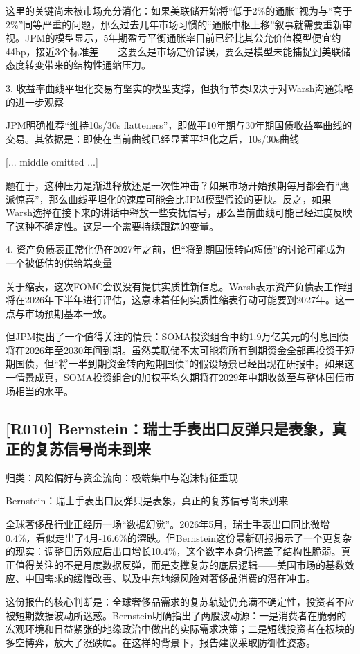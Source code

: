 \documentclass[11pt]{ctexart}
\begin{document}
这里的关键尚未被市场充分消化：如果美联储开始将“低于2\%的通胀”视为与“高于2\%”同等严重的问题，那么过去几年市场习惯的“通胀中枢上移”叙事就需要重新审视。JPM的模型显示，5年期盈亏平衡通胀率目前已经比其公允价值模型便宜约44bp，接近3个标准差——这要么是市场定价错误，要么是模型未能捕捉到美联储态度转变带来的结构性通缩压力。

3. 收益率曲线平坦化交易有坚实的模型支撑，但执行节奏取决于对Warsh沟通策略的进一步观察

JPM明确推荐“维持10s/30s flatteners”，即做平10年期与30年期国债收益率曲线的交易。其依据是：即使在当前曲线已经显著平坦化之后，10s/30s曲线

[... middle omitted ...]

题在于，这种压力是渐进释放还是一次性冲击？如果市场开始预期每月都会有“鹰派惊喜”，那么曲线平坦化的速度可能会比JPM模型假设的更快。反之，如果Warsh选择在接下来的讲话中释放一些安抚信号，那么当前曲线可能已经过度反映了这种不确定性。这是一个需要持续跟踪的变量。

4. 资产负债表正常化仍在2027年之前，但“将到期国债转向短债”的讨论可能成为一个被低估的供给端变量

关于缩表，这次FOMC会议没有提供实质性新信息。Warsh表示资产负债表工作组将在2026年下半年进行评估，这意味着任何实质性缩表行动可能要到2027年。这一点与市场预期基本一致。

但JPM提出了一个值得关注的情景：SOMA投资组合中约1.9万亿美元的付息国债将在2026年至2030年间到期。虽然美联储不太可能将所有到期资金全部再投资于短期国债，但“将一半到期资金转向短期国债”的假设场景已经出现在研报中。如果这一情景成真，SOMA投资组合的加权平均久期将在2029年中期收敛至与整体国债市场相当的水平。

\subsection{[R010] Bernstein：瑞士手表出口反弹只是表象，真正的复苏信号尚未到来}
{\small\color{refgray}归类：风险偏好与资金流向：极端集中与泡沫特征重现}

Bernstein：瑞士手表出口反弹只是表象，真正的复苏信号尚未到来

全球奢侈品行业正经历一场“数据幻觉”。2026年5月，瑞士手表出口同比微增0.4\%，看似走出了4月-16.6\%的深跌。但Bernstein这份最新研报揭示了一个更复杂的现实：调整日历效应后出口增长10.4\%，这个数字本身仍掩盖了结构性脆弱。真正值得关注的不是月度数据反弹，而是支撑复苏的底层逻辑——美国市场的基数效应、中国需求的缓慢改善、以及中东地缘风险对奢侈品消费的潜在冲击。

这份报告的核心判断是：全球奢侈品需求的复苏轨迹仍充满不确定性，投资者不应被短期数据波动所迷惑。Bernstein明确指出了两股波动源：一是消费者在脆弱的宏观环境和日益紧张的地缘政治中做出的实际需求决策；二是短线投资者在板块的多空博弈，放大了涨跌幅。在这样的背景下，报告建议采取防御性姿态。
\end{document}
